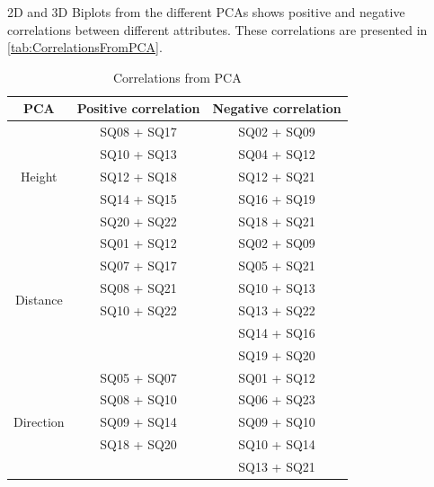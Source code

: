 \noindent
%
2D and 3D Biplots from the different PCAs shows positive and negative correlations between different attributes. These correlations are presented in \autoref{tab:CorrelationsFromPCA}.
%
\begin{table}[H]
	\centering
	\caption{Correlations from PCA}
	\label{tab:CorrelationsFromPCA} 
	\begin{tabular}{ c|c|c }
		\centering
		PCA & Positive correlation & Negative correlation \\ \hline
		\multirow{5}{*}{Height} & SQ08  + SQ17 & SQ02  + SQ09 \\
		& SQ10 + SQ13 & SQ04 + SQ12 \\
		& SQ12 + SQ18 & SQ12 + SQ21 \\
		& SQ14 + SQ15 & SQ16 + SQ19 \\
		& SQ20 + SQ22 & SQ18 + SQ21\\ \hline
		\multirow{6}{*}{Distance} & SQ01 + SQ12 & SQ02 + SQ09 \\
		& SQ07 + SQ17 & SQ05 + SQ21 \\
		& SQ08 + SQ21 & SQ10 + SQ13 \\
		& SQ10 + SQ22 & SQ13 + SQ22 \\
		&  & SQ14 + SQ16 \\	
		&  & SQ19 + SQ20 \\ \hline	
		\multirow{5}{*}{Direction} 
		& SQ05 + SQ07 & SQ01 + SQ12 \\
		& SQ08 + SQ10 & SQ06 + SQ23 \\
		& SQ09 + SQ14 & SQ09 + SQ10 \\
		& SQ18 + SQ20 & SQ10 + SQ14 \\
		&  & SQ13 + SQ21
	\end{tabular}        
\end{table}
